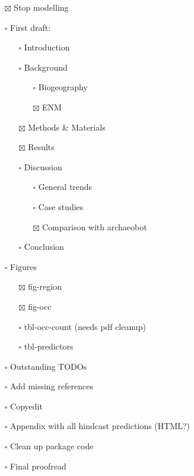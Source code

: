 \documentclass[
  authoryear,
  review]{elsarticle}
\providecommand{\tightlist}{%
  \setlength{\itemsep}{0pt}\setlength{\parskip}{0pt}}\usepackage{longtable,booktabs,array}
\begin{document}
\begin{itemize}
\tightlist
\item[$\boxtimes$]
  Stop modelling
\item[$\square$]
  First draft:

  \begin{itemize}
  \tightlist
  \item[$\square$]
    Introduction
  \item[$\square$]
    Background

    \begin{itemize}
    \tightlist
    \item[$\square$]
      Biogeography
    \item[$\boxtimes$]
      ENM
    \end{itemize}
  \item[$\boxtimes$]
    Methods \& Materials
  \item[$\boxtimes$]
    Results
  \item[$\square$]
    Discussion

    \begin{itemize}
    \tightlist
    \item[$\square$]
      General trends
    \item[$\square$]
      Case studies
    \item[$\boxtimes$]
      Comparison with archaeobot
    \end{itemize}
  \item[$\square$]
    Conclusion
  \end{itemize}
\item[$\square$]
  Figures

  \begin{itemize}
  \tightlist
  \item[$\boxtimes$]
    fig-region
  \item[$\boxtimes$]
    fig-occ
  \item[$\square$]
    tbl-occ-count (needs pdf cleanup)
  \item[$\square$]
    tbl-predictors
  \end{itemize}
\item[$\square$]
  Outstanding TODOs
\item[$\square$]
  Add missing references
\item[$\square$]
  Copyedit
\item[$\square$]
  Appendix with all hindcast predictions (HTML?)
\item[$\square$]
  Clean up package code
\item[$\square$]
  Final proofread
\end{itemize}
\end{document}
